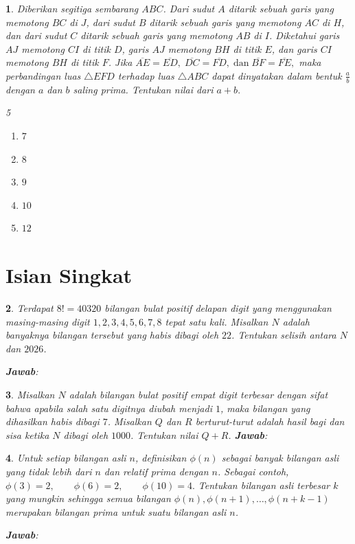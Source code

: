 \documentclass[11pt,a4paper,DIV=12]{scrartcl}
\newcommand\answerbox{%
\vspace*{0.5cm}%
\noindent\textbf{\textsf{Jawab}}: \fbox{\rule{14cm}{0pt}\rule[-0.2ex]{0pt}{1.9ex}}}
\theoremstyle{problemstyle}
\newtheorem{problem}{}
\theoremstyle{answerstyle}
\newenvironment{choices}[1][5]{%
  \begin{multicols}{#1}%
  \begin{enumerate}[label=(\Alph*)]%
}{%
  \end{enumerate}%
  \end{multicols}%
}
\begin{document}
\begin{problem}
  Diberikan segitiga sembarang \(ABC\).
  Dari sudut \(A\) ditarik sebuah garis yang memotong \(BC\) di \(J\), dari sudut \(B\) ditarik sebuah garis yang memotong \(AC\) di \(H\), dan dari sudut \(C\) ditarik sebuah garis yang memotong \(AB\) di \(I\).
  Diketahui garis \(AJ\) memotong \(CI\) di titik \(D\), garis \(AJ\) memotong \(BH\) di titik \(E\), dan garis \(CI\) memotong \(BH\) di titik \(F\).
  Jika
  $
    \overline{AE}=\overline{ED},\; \overline{DC}=\overline{FD},\; \text{dan}\; \overline{BF}=\overline{FE},
  $
  maka perbandingan luas \(\triangle EFD\) terhadap luas \(\triangle ABC\) dapat dinyatakan dalam bentuk
  $
    \frac ab
  $
  dengan \(a\) dan \(b\) saling prima.
  Tentukan nilai dari
  $
    a+b.
  $

  \begin{choices}
    \item $7$
    \item $8$
    \item $9$
    \item $10$
    \item $12$
  \end{choices}

\end{problem}

\section*{Isian Singkat}
\begin{problem}
  Terdapat \(8! = 40320\) bilangan bulat positif delapan digit yang menggunakan masing-masing digit
  $
    1,2,3,4,5,6,7,8
  $
  tepat satu kali.
  Misalkan \(N\) adalah banyaknya bilangan tersebut yang habis dibagi oleh \(22\).
  Tentukan selisih antara \(N\) dan \(2026\).

  \answerbox
\end{problem}

\begin{problem}
  Misalkan \(N\) adalah bilangan bulat positif empat digit terbesar dengan sifat bahwa apabila salah satu digitnya diubah menjadi \(1\), maka bilangan yang dihasilkan habis dibagi \(7\).
  Misalkan \(Q\) dan \(R\) berturut-turut adalah hasil bagi dan sisa ketika \(N\) dibagi oleh \(1000\).
  Tentukan nilai \(Q+R\).
  \answerbox
\end{problem}

\begin{problem}
  Untuk setiap bilangan asli \(n\), definisikan \(\phi(n)\) sebagai banyak bilangan asli yang tidak lebih dari \(n\) dan relatif prima dengan \(n\).
  Sebagai contoh,
  $
    \phi(3)=2,\qquad \phi(6)=2,\qquad \phi(10)=4.
  $
  Tentukan bilangan asli terbesar \(k\) yang mungkin sehingga semua bilangan
  $
    \phi(n),\phi(n+1),\dots,\phi(n+k-1)
  $
  merupakan bilangan prima untuk suatu bilangan asli \(n\).

  \answerbox
\end{problem}
\end{document}
